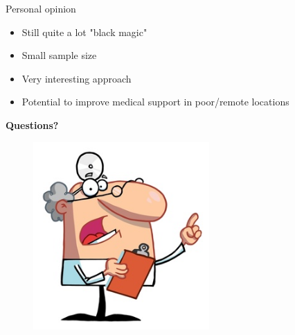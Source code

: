 \documentclass{beamer}
\begin{document}
\begin{frame}{Personal opinion}
\begin{itemize}
	\item[\negativeaspect] Still quite a lot "black magic" \pause
	\item[\negativeaspect] Small sample size \pause
	\item[\positiveaspect] Very interesting approach \pause
	\item[\positiveaspect] Potential to improve medical support in poor/remote locations
\end{itemize}
\end{frame}

\begin{frame}
	\begin{center}
	\textbf{\Huge Questions?}\\
	\begin{figure}
		\includegraphics[width=0.6\textwidth]{doctor_clipart.jpg}
	\end{figure}
	\end{center}
\end{frame}
\end{document}

